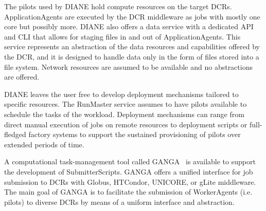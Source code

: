 \documentclass{sig-alternate}
\begin{document}
 


The pilots used by DIANE hold compute resources on the target DCRs.
ApplicationAgents are executed by the DCR middleware as jobs with mostly one
core but possibly more. DIANE also offers a data service with a dedicated API
and CLI that allows for staging files in and out of ApplicationAgents. This
service represents an abstraction of the data resources and capabilities offered
by the DCR, and it is designed to handle data only in the form of files stored
into a file system. Network resources are assumed to be available and no
abstractions are offered.


DIANE leaves the user free to develop deployment mechanisms tailored to specific
resources. The RunMaster service assumes to have pilots available to schedule
the tasks of the workload. Deployment mechanisms can range from direct manual
execution of jobs on remote resources to deployment scripts or full-fledged
factory systems to support the sustained provisioning of pilots over extended
periods of time.

A computational task-management tool called
GANGA~\cite{moscicki2009ganga,ganga_url} is available to support the development
of SubmitterScripts. GANGA offers a unified interface for job submission to DCRs
with Globus, HTCondor, UNICORE, or gLite middleware. The main goal of GANGA is to
facilitate the submission of WorkerAgents (i.e. pilots) to diverse DCRs by means
of a uniform interface and abstraction.
\end{document}
